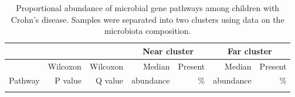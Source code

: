 \newpage
{\scriptsize
	\renewcommand{\arraystretch}{0.8} \setlength{\tabcolsep}{1pt}
	\begin{longtable}{ | l | r | r | r | r | r | r  | }
		\caption[Proportional abundance of microbial gene pathways among children with Crohn’s disease]{Proportional abundance of microbial gene pathways among children with Crohn’s disease. Samples were separated into two clusters using data on the microbiota composition.} 
		\label{TS5} \\
		
		\hline
		\multicolumn{3}{|c|}{} & \multicolumn{2}{c}{Near cluster}
		& \multicolumn{2}{|c|}{Far cluster}\\
		\hline 
		& Wilcoxon & Wilcoxon & Median& Present & Median &  Present\\ 
		Pathway & P value & Q value & abundance & \% & abundance & \% \\ 
		\hline 
		\endfirsthead
		
		
		\endfoot
		
		\hline 
		\endlastfoot
		
		
		

\end{longtable}}
